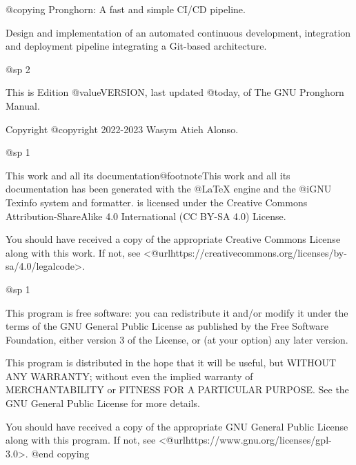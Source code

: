 @copying
Pronghorn: A fast and simple CI/CD pipeline.

Design and implementation of an automated continuous development, integration and deployment pipeline integrating a Git-based architecture.

@sp 2

This is Edition @value{VERSION}, last updated @today{}, of The GNU Pronghorn Manual.

Copyright @copyright{} 2022-2023 Wasym Atieh Alonso.

@sp 1

This work and all its documentation@footnote{This work and all its documentation has been generated with the @LaTeX{} engine and the @i{GNU Texinfo} system and formatter.} is licensed under the Creative Commons Attribution-ShareAlike 4.0 International (CC BY-SA 4.0) License.

You should have received a copy of the appropriate Creative Commons License along with this work. If not, see <@url{https://creativecommons.org/licenses/by-sa/4.0/legalcode}>.

@sp 1

This program is free software: you can redistribute it and/or modify it under the terms of the GNU General Public License as published by the Free Software Foundation, either version 3 of the License, or (at your option) any later version.

This program is distributed in the hope that it will be useful, but WITHOUT ANY WARRANTY; without even the implied warranty of MERCHANTABILITY or FITNESS FOR A PARTICULAR PURPOSE. See the GNU General Public License for more details.

You should have received a copy of the appropriate GNU General Public License along with this program. If not, see <@url{https://www.gnu.org/licenses/gpl-3.0}>.
@end copying
